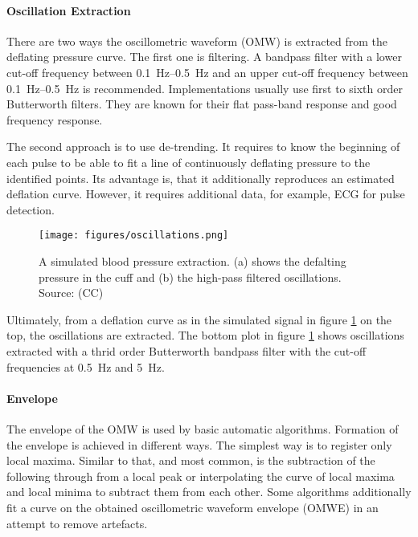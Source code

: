 \paragraph{Oscillation Extraction} There are two ways the oscillometric waveform (OMW) is extracted from the deflating pressure curve. The first one is filtering. A bandpass filter with a lower cut-off frequency between \SIrange{0.1}{0.5}{\Hz} and an upper cut-off frequency between \SIrange{0.1}{0.5}{\Hz} is recommended. \cite{Forouzanfar2015} Implementations usually use first \cite{Lim2015} to sixth order \cite{Jazbinsek2010} Butterworth filters. They are known for their flat pass-band response and good frequency response. 

The second approach is to use de-trending. It requires to know the beginning of each pulse to be able to fit a line of continuously deflating pressure to the identified points. Its advantage is, that it additionally reproduces an estimated deflation curve. However, it requires additional data, for example, ECG for pulse detection.\cite{Forouzanfar2015}

\begin{figure}[h]
\centering
\texttt{[image: figures/oscillations.png]}
\caption{A simulated blood pressure extraction. (a) shows the defalting pressure in the cuff and (b) the high-pass filtered oscillations. Source: \cite{Babbs2012} (CC)}
\label{fig:osc}
\end{figure}

Ultimately, from a deflation curve as in the simulated signal in figure \ref{fig:osc} on the top, the oscillations are extracted. The bottom plot in figure \ref{fig:osc} shows oscillations extracted with a thrid order Butterworth bandpass filter with the cut-off frequencies at \SI{0.5}{\Hz} and \SI{5}{\Hz}. \cite{Babbs2012} 


\paragraph{Envelope} The envelope of the OMW is used by basic automatic algorithms. Formation of the envelope is achieved in different ways. The simplest way is to register only local maxima. Similar to that, and most common, is the subtraction of the following through from a local peak or interpolating the curve of local maxima and local minima to subtract them from each other. Some algorithms additionally fit a curve on the obtained oscillometric waveform envelope (OMWE) in an attempt to remove artefacts. \cite{Forouzanfar2014}



